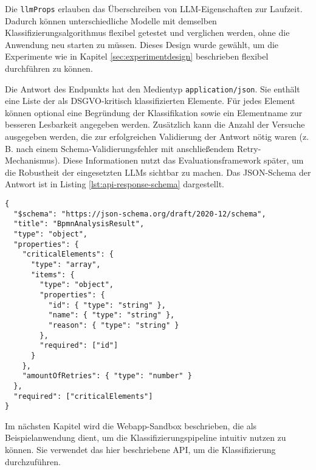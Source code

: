 Die \texttt{llmProps} erlauben das Überschreiben von \ac{LLM}-Eigenschaften zur Laufzeit. Dadurch können unterschiedliche Modelle mit demselben Klassifizierungsalgorithmus flexibel getestet und verglichen werden, ohne die Anwendung neu starten zu müssen. Dieses Design wurde gewählt, um die Experimente wie in Kapitel \ref{sec:experimentdesign} beschrieben flexibel durchführen zu können.

Die Antwort des Endpunkts hat den Medientyp \texttt{application/json}. Sie enthält eine Liste der als \ac{DSGVO}-kritisch klassifizierten Elemente. Für jedes Element können optional eine Begründung der Klassifikation sowie ein Elementname zur besseren Lesbarkeit angegeben werden. Zusätzlich kann die Anzahl der Versuche ausgegeben werden, die zur erfolgreichen Validierung der Antwort nötig waren (z.\,B. nach einem Schema-Validierungsfehler mit anschließendem Retry-Mechanismus). Diese Informationen nutzt das Evaluationsframework später, um die Robustheit der eingesetzten \acp{LLM} sichtbar zu machen. Das JSON-Schema der Antwort ist in Listing \ref{lst:api-response-schema} dargestellt.

\begin{lstlisting}[caption={JSON-Schema der API-Antwort.},label={lst:api-response-schema}]
{
  "$schema": "https://json-schema.org/draft/2020-12/schema",
  "title": "BpmnAnalysisResult",
  "type": "object",
  "properties": {
    "criticalElements": {
      "type": "array",
      "items": {
        "type": "object",
        "properties": {
          "id": { "type": "string" },
          "name": { "type": "string" },
          "reason": { "type": "string" }
        },
        "required": ["id"]
      }
    },
    "amountOfRetries": { "type": "number" }
  },
  "required": ["criticalElements"]
}
\end{lstlisting}

\newpage
Im nächsten Kapitel wird die Webapp-Sandbox beschrieben, die als Beispielanwendung dient, um die Klassifizierungspipeline intuitiv nutzen zu können. Sie verwendet das hier beschriebene API, um die Klassifizierung durchzuführen.